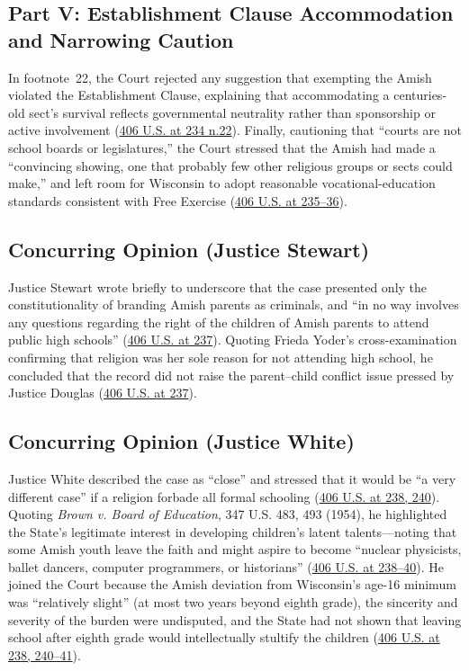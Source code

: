 \documentclass[12pt]{article}
\begin{document}
\subsection{Part V: Establishment Clause Accommodation and Narrowing Caution}

In footnote~22, the Court rejected any suggestion that exempting the Amish violated the Establishment Clause, explaining that accommodating a centuries-old sect's survival reflects governmental neutrality rather than sponsorship or active involvement (\href{https://supreme.justia.com/cases/federal/us/406/205/}{406 U.S. at 234 n.22}). Finally, cautioning that ``courts are not school boards or legislatures,'' the Court stressed that the Amish had made a ``convincing showing, one that probably few other religious groups or sects could make,'' and left room for Wisconsin to adopt reasonable vocational-education standards consistent with Free Exercise (\href{https://supreme.justia.com/cases/federal/us/406/205/}{406 U.S. at 235--36}).

\subsection{Concurring Opinion (Justice Stewart)}

Justice Stewart wrote briefly to underscore that the case presented only the constitutionality of branding Amish parents as criminals, and ``in no way involves any questions regarding the right of the children of Amish parents to attend public high schools'' (\href{https://supreme.justia.com/cases/federal/us/406/205/}{406 U.S. at 237}). Quoting Frieda Yoder's cross-examination confirming that religion was her sole reason for not attending high school, he concluded that the record did not raise the parent--child conflict issue pressed by Justice Douglas (\href{https://supreme.justia.com/cases/federal/us/406/205/}{406 U.S. at 237}).

\subsection{Concurring Opinion (Justice White)}

Justice White described the case as ``close'' and stressed that it would be ``a very different case'' if a religion forbade all formal schooling (\href{https://supreme.justia.com/cases/federal/us/406/205/}{406 U.S. at 238, 240}). Quoting \emph{Brown v. Board of Education}, 347 U.S. 483, 493 (1954), he highlighted the State's legitimate interest in developing children's latent talents---noting that some Amish youth leave the faith and might aspire to become ``nuclear physicists, ballet dancers, computer programmers, or historians'' (\href{https://supreme.justia.com/cases/federal/us/406/205/}{406 U.S. at 238--40}). He joined the Court because the Amish deviation from Wisconsin's age-16 minimum was ``relatively slight'' (at most two years beyond eighth grade), the sincerity and severity of the burden were undisputed, and the State had not shown that leaving school after eighth grade would intellectually stultify the children (\href{https://supreme.justia.com/cases/federal/us/406/205/}{406 U.S. at 238, 240--41}).
\end{document}
